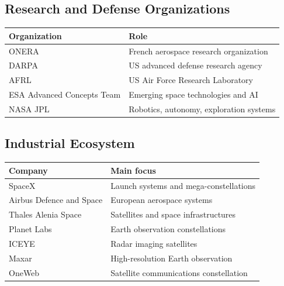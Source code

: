 \documentclass[10pt,a4paper,twocolumn]{article}
\begin{document}

\subsection{Research and Defense Organizations}

\begin{tabularx}{\columnwidth}{lX}
    \toprule
    Organization               & Role                                    \\
    \midrule
    ONERA                      & French aerospace research organization  \\
    DARPA                      & US advanced defense research agency     \\
    AFRL                       & US Air Force Research Laboratory        \\
    ESA Advanced Concepts Team & Emerging space technologies and AI      \\
    NASA JPL                   & Robotics, autonomy, exploration systems \\
    \bottomrule
\end{tabularx}


\subsection{Industrial Ecosystem}

\begin{tabularx}{\columnwidth}{lX}
    \toprule
    Company                  & Main focus                             \\
    \midrule
    SpaceX                   & Launch systems and mega-constellations \\
    Airbus Defence and Space & European aerospace systems             \\
    Thales Alenia Space      & Satellites and space infrastructures   \\
    Planet Labs              & Earth observation constellations       \\
    ICEYE                    & Radar imaging satellites               \\
    Maxar                    & High-resolution Earth observation      \\
    OneWeb                   & Satellite communications constellation \\
    \bottomrule
\end{tabularx}
\end{document}
